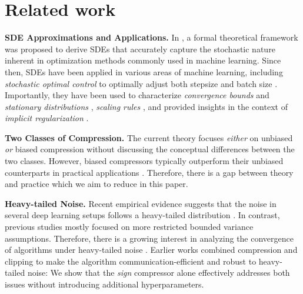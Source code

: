 \section{Related work}
\label{sec:RelatedWorks}


\textbf{SDE Approximations and Applications.} In \citep{li2017stochastic}, a formal theoretical framework was proposed to derive SDEs that accurately capture the stochastic nature inherent in optimization methods commonly used in machine learning. Since then, SDEs have been applied in various areas of machine learning, including \emph{stochastic optimal control} to optimally adjust both stepsize \citep{li2017stochastic,li2019stochastic} and batch size \citep{zhao2022batch}. Importantly, they have been used to characterize \emph{convergence bounds} and \emph{stationary distributions} \citep{compagnoni2023sde,compagnoni2024sde,compagnoni2025adaptive}, \emph{scaling rules} \citep{jastrzkebski2017three,Malladi2022AdamSDE,compagnoni2025adaptive}, and provided insights in the context of \emph{implicit regularization} \citep{smith2021origin,compagnoni2023sde}.

\textbf{Two Classes of Compression.} The current theory focuses \textit{either} on unbiased \citep{condat2022ef,PD2025, mishchenko2024distributed, islamov2021distributed} \textit{or} biased \citep{gao2023econtrol, fatkhullin2024momentum} compression without discussing the conceptual differences between the two classes. However, biased compressors typically outperform their unbiased counterparts in practical applications \citep{seide20141}. Therefore, there is a gap between theory and practice which we aim to reduce in this paper.

\textbf{Heavy-tailed Noise.} Recent empirical evidence suggests that the noise in several deep learning setups follows a heavy-tailed distribution \citep{simsekli2019tail, zhang2020adaptive, gurbuzbalaban2021heavy, kunstner2024heavy}. In contrast, previous studies mostly focused on more restricted bounded variance assumptions. Therefore, there is a growing interest in analyzing the convergence of algorithms under heavy-tailed noise  \citep{devlin2018bert, sun2023distributed, yang2022taming, gorbunov2023high}. Earlier works \citep{khirirat2023clip21, li2023convergenceandprivacy, yu2023smoothed} combined compression and clipping to make the algorithm communication-efficient and robust to heavy-tailed noise: We show that the \textit{sign} compressor alone effectively addresses both issues without introducing additional hyperparameters.


